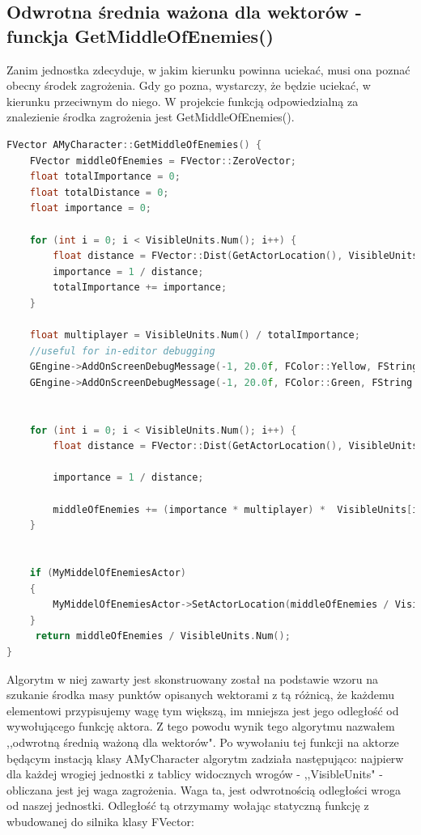 \documentclass[12pt]{report}
\begin{document}
\subsection{Odwrotna średnia ważona dla wektorów - funckja GetMiddleOfEnemies()}

Zanim jednostka zdecyduje, w jakim kierunku powinna uciekać, musi ona poznać obecny środek zagrożenia. Gdy go pozna, wystarczy, że będzie uciekać, w kierunku przeciwnym do niego. W projekcie funkcją odpowiedzialną za znalezienie środka zagrożenia jest GetMiddleOfEnemies().

\begin{lstlisting}[language=C++, backgroundcolor=\color{black!5}, basicstyle=\footnotesize, caption=Funkcja GetMiddleOfEnemies() w klasie AMyCharacter]
FVector AMyCharacter::GetMiddleOfEnemies() {
	FVector middleOfEnemies = FVector::ZeroVector;
	float totalImportance = 0;		
	float totalDistance = 0;
	float importance = 0;

	for (int i = 0; i < VisibleUnits.Num(); i++) {
		float distance = FVector::Dist(GetActorLocation(), VisibleUnits[i]->GetActorLocation());
		importance = 1 / distance;
		totalImportance += importance;
	}

	float multiplayer = VisibleUnits.Num() / totalImportance;
	//useful for in-editor debugging
	GEngine->AddOnScreenDebugMessage(-1, 20.0f, FColor::Yellow, FString::Printf(TEXT("%f"), totalImportance));
	GEngine->AddOnScreenDebugMessage(-1, 20.0f, FColor::Green, FString::Printf(TEXT("%f"), multiplayer));


	for (int i = 0; i < VisibleUnits.Num(); i++) {
		float distance = FVector::Dist(GetActorLocation(), VisibleUnits[i]->GetActorLocation());

		importance = 1 / distance;

		middleOfEnemies += (importance * multiplayer) *  VisibleUnits[i]->GetActorLocation();
	}

	
	if (MyMiddelOfEnemiesActor)
	{
		MyMiddelOfEnemiesActor->SetActorLocation(middleOfEnemies / VisibleUnits.Num());
	}
	 return middleOfEnemies / VisibleUnits.Num();
}
\end{lstlisting}

Algorytm w niej zawarty jest skonstruowany został na podstawie wzoru na szukanie środka masy punktów opisanych wektorami z tą różnicą, że każdemu elementowi przypisujemy wagę tym większą, im mniejsza jest jego odległość od wywołującego funkcję aktora. Z tego powodu wynik tego algorytmu nazwałem ,,odwrotną średnią ważoną dla wektorów". Po wywołaniu tej funkcji na aktorze będącym instacją klasy AMyCharacter algorytm zadziała następująco:
najpierw dla każdej wrogiej jednostki z tablicy widocznych wrogów - ,,VisibleUnits" - obliczana jest jej waga zagrożenia. Waga ta, jest odwrotnością odległości wroga od naszej jednostki. Odległość tą otrzymamy wołając statyczną funkcję z wbudowanej do silnika klasy FVector:
\end{document}
